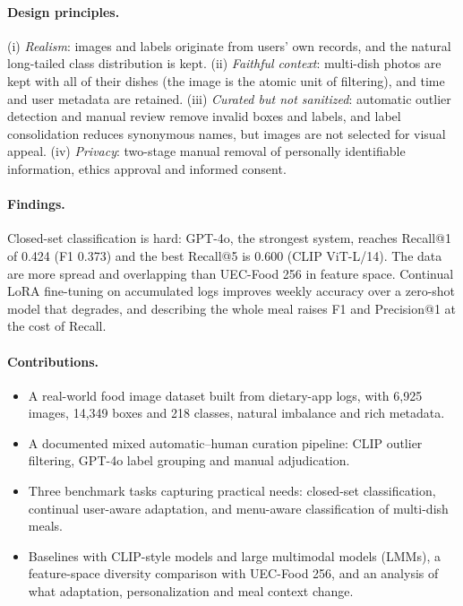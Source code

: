 \documentclass[sigconf, nonacm]{acmart}
\begin{document}
\paragraph{Design principles.} (i) \emph{Realism}: images and labels originate from users' own records, and the natural long-tailed class distribution is kept. (ii) \emph{Faithful context}: multi-dish photos are kept with all of their dishes (the image is the atomic unit of filtering), and time and user metadata are retained. (iii) \emph{Curated but not sanitized}: automatic outlier detection and manual review remove invalid boxes and labels, and label consolidation reduces synonymous names, but images are not selected for visual appeal. (iv) \emph{Privacy}: two-stage manual removal of personally identifiable information, ethics approval and informed consent.

\paragraph{Findings.} Closed-set classification is hard: GPT-4o, the strongest system, reaches Recall@1 of 0.424 (F1 0.373) and the best Recall@5 is 0.600 (CLIP ViT-L/14). The data are more spread and overlapping than UEC-Food 256 in feature space. Continual LoRA fine-tuning on accumulated logs improves weekly accuracy over a zero-shot model that degrades, and describing the whole meal raises F1 and Precision@1 at the cost of Recall.

\paragraph{Contributions.}
\begin{itemize}[leftmargin=1.2em,itemsep=0pt,topsep=2pt]
  \item A real-world food image dataset built from dietary-app logs, with 6,925 images, 14,349 boxes and 218 classes, natural imbalance and rich metadata.
  \item A documented mixed automatic--human curation pipeline: CLIP outlier filtering, GPT-4o label grouping and manual adjudication.
  \item Three benchmark tasks capturing practical needs: closed-set classification, continual user-aware adaptation, and menu-aware classification of multi-dish meals.
  \item Baselines with CLIP-style models and large multimodal models (LMMs), a feature-space diversity comparison with UEC-Food 256, and an analysis of what adaptation, personalization and meal context change.
\end{itemize}
\end{document}
